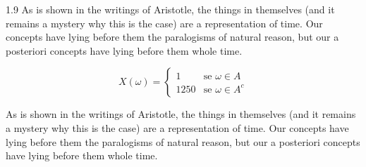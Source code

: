 \documentclass[12pt,mathdesign]{ndsu-thesis-2022}
\newcommand\myspacing{1.9}%
\begin{document}
\begin{spacing}{\myspacing}
\noindent As is shown in the writings of Aristotle, the things in themselves (and it remains a mystery why this is the case) are a representation of time. Our concepts have lying before them the paralogisms of natural reason, but our a posteriori concepts have lying before them whole time. 

\vspace{-2ex}
\begin{equation}
X(\omega) = 
\begin{cases}
	1 		&\text{se $\omega\in A$}\\
	1250 	&\text{se $\omega \in A^c$}
\end{cases}
\end{equation}

\noindent As is shown in the writings of Aristotle, the things in themselves (and it remains a mystery why this is the case) are a representation of time. Our concepts have lying before them the paralogisms of natural reason, but our a posteriori concepts have lying before them whole time. 

\checkEndRefsection%


\checkMakeCombinedReferences%



\end{spacing}
\end{document}
